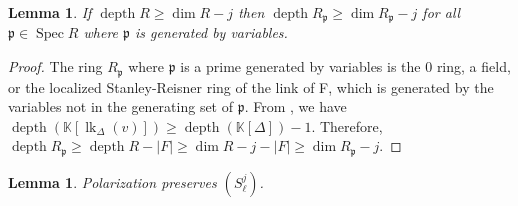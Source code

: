 \documentclass[11pt]{amsart}
\numberwithin{equation}{section}
\newtheorem{lemma}[theorem]{Lemma}
\theoremstyle{definition}
\theoremstyle{remark}
\newcommand{\lk}{\operatorname{lk}}
\newcommand{\Spec}{\operatorname{Spec}}
\newcommand{\depth}{\operatorname{depth}}
\begin{document}
\begin{lemma}
If $\depth R \geq \dim R - j$ then $\depth R_\mathfrak{p} \geq \dim R_\mathfrak{p} - j$ for all $\mathfrak{p} \in \Spec R$ where $\mathfrak{p}$ is generated by variables.
\end{lemma}

\begin{proof}
The ring $R_\mathfrak{p}$ where $\mathfrak{p}$ is a prime generated by variables is the $0$ ring, a field, or the localized Stanley-Reisner ring of the link of F, which is generated by the variables not in the generating set of $\mathfrak{p}$.  From \cite{MT09}, we have $\depth(\mathbb{K}[\lk_\Delta(v)]) \geq \depth(\mathbb{K}[\Delta])-1$.  Therefore, $\depth R_\mathfrak{p} \geq \depth R - |F| \geq \dim R - j -|F| \geq \dim R_\mathfrak{p} -j$.
\end{proof}

\begin{lemma}
Polarization preserves $(S_\ell^j)$.
\end{lemma}
\end{document}

